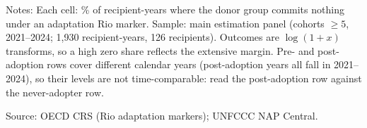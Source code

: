 \begin{table}[H]
\centering
\caption{Share of recipient-years with zero adaptation-marked commitments, by donor type}
\label{tab:zero_shares_donor}
\begingroup\small
{}
\endgroup
\par\vspace{4pt}
\begin{minipage}{\linewidth}\footnotesize
Notes: Each cell: \% of recipient-years where the donor group commits nothing under an adaptation Rio marker. Sample: main estimation panel (cohorts $\geq 5$, 2021--2024; 1,930 recipient-years, 126 recipients). Outcomes are $\log(1+x)$ transforms, so a high zero share reflects the extensive margin. Pre- and post-adoption rows cover different calendar years (post-adoption years all fall in 2021--2024), so their levels are not time-comparable: read the post-adoption row against the never-adopter row.\par
Source: OECD CRS (Rio adaptation markers); UNFCCC NAP Central.
\end{minipage}
\end{table}
